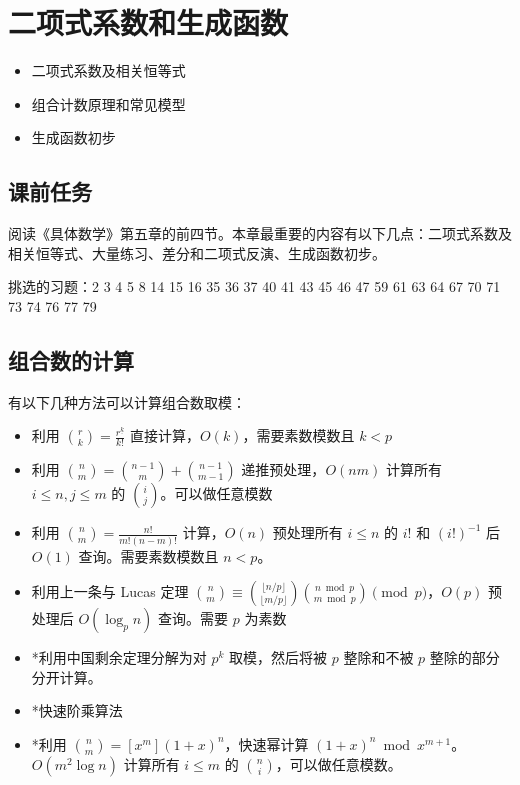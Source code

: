 \chapter{二项式系数和生成函数}


\begin{overview}
    \begin{itemize}
        \item 二项式系数及相关恒等式
        \item 组合计数原理和常见模型
        \item 生成函数初步
    \end{itemize}
\end{overview}

\section{课前任务}
阅读《具体数学》第五章的前四节。本章最重要的内容有以下几点：二项式系数及相关恒等式、大量练习、差分和二项式反演、生成函数初步。
    
挑选的习题：2 3 4 5 8 14 15 16 35 36 37 40 41 43 45 46 47 59 61 63 64 67 70 71 73 74 76 77 79

\section{组合数的计算}

有以下几种方法可以计算组合数取模：
\begin{itemize}
    \item 利用 $\binom{r}{k}=\frac{r^{\underline{k}}}{k!}$ 直接计算，$O(k)$，需要素数模数且 $k<p$
    \item 利用 $\binom{n}{m}=\binom{n-1}{m}+\binom{n-1}{m-1}$ 递推预处理，$O(nm)$ 计算所有 $i\le n,j\le m$ 的 $\binom{i}{j}$。可以做任意模数
    \item 利用 $\binom{n}{m}=\frac{n!}{m!(n-m)!}$ 计算，$O(n)$ 预处理所有 $i\le n$ 的 $i!$ 和 $(i!)^{-1}$ 后 $O(1)$ 查询。需要素数模数且 $n<p$。
    \item 利用上一条与 Lucas 定理 $\binom{n}{m}\equiv \binom{\lfloor n/p\rfloor}{\lfloor m/p\rfloor}\binom{n \bmod p}{m \bmod p} \pmod p$，$O(p)$ 预处理后 $O(\log_p n)$ 查询。需要 $p$ 为素数
    \item *利用中国剩余定理分解为对 $p^k$ 取模，然后将被 $p$ 整除和不被 $p$ 整除的部分分开计算。
    \item *快速阶乘算法
    \item *利用 $\binom{n}{m}=[x^m](1+x)^n$，快速幂计算 $(1+x)^n\bmod x^{m+1}$。$O(m^2\log n)$ 计算所有 $i\le m$ 的 $\binom{n}{i}$，可以做任意模数。
\end{itemize}

